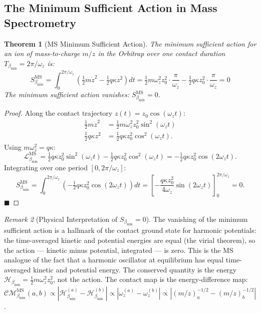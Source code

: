 \documentclass[11pt,twocolumn,a4paper]{article}
\theoremstyle{plain}
\newtheorem{theorem}{Theorem}[section]
\theoremstyle{definition}
\theoremstyle{remark}
\newtheorem{remark}[theorem]{Remark}
\newcommand{\bmin}{\beta_{\min}}
\newcommand{\Lmin}{\mathcal{L}_{\bmin}}
\newcommand{\Smin}{S_{\bmin}}
\newcommand{\Hmin}{\mathcal{H}_{\bmin}}
\newcommand{\CM}{\mathcal{CM}}
\newcommand{\half}{\tfrac{1}{2}}
\renewcommand{\qed}{\hfill$\blacksquare$}
\begin{document}
\subsection{The Minimum Sufficient Action in Mass Spectrometry}

\begin{theorem}[MS Minimum Sufficient Action]
\label{thm:ms_action}
The minimum sufficient action for an ion of mass-to-charge $m/z$ in the
Orbitrap over one contact duration $T_{\bmin} = 2\pi/\omega_z$ is:
\[
  \Smin^{\mathrm{MS}} = \int_0^{2\pi/\omega_z}
  \left(\half m\dot{z}^2 - \half q\kappa z^2\right)dt
  = \half m\omega_z^2 z_0^2 \cdot \frac{\pi}{\omega_z} - \half q\kappa z_0^2
  \cdot \frac{\pi}{\omega_z} = 0
\]
The minimum sufficient action vanishes: $\Smin^{\mathrm{MS}} = 0$.
\end{theorem}

\begin{proof}
Along the contact trajectory $z(t) = z_0\cos(\omega_z t)$:
\begin{align*}
  \half m\dot{z}^2 &= \half m\omega_z^2 z_0^2\sin^2(\omega_z t) \\
  \half q\kappa z^2 &= \half q\kappa z_0^2\cos^2(\omega_z t).
\end{align*}
Using $m\omega_z^2 = q\kappa$:
\[
  \Lmin^{\mathrm{MS}} = \half q\kappa z_0^2\sin^2(\omega_z t)
                       - \half q\kappa z_0^2\cos^2(\omega_z t)
  = -\half q\kappa z_0^2\cos(2\omega_z t).
\]
Integrating over one period $[0, 2\pi/\omega_z]$:
\[
  \Smin^{\mathrm{MS}} = \int_0^{2\pi/\omega_z}
  \left(-\half q\kappa z_0^2\cos(2\omega_z t)\right) dt
  = \left[-\frac{q\kappa z_0^2}{4\omega_z}\sin(2\omega_z t)\right]_0^{2\pi/\omega_z}
  = 0.
\]
\qed
\end{proof}

\begin{remark}[Physical Interpretation of $\Smin = 0$]
The vanishing of the minimum sufficient action is a hallmark of the contact
ground state for harmonic potentials: the time-averaged kinetic and potential
energies are equal (the virial theorem), so the action --- kinetic minus
potential, integrated --- is zero. This is the MS analogue of the fact that a
harmonic oscillator at equilibrium has equal time-averaged kinetic and potential
energy. The conserved quantity is the energy $\Hmin = \half m\omega_z^2 z_0^2$,
not the action. The contact map is the energy-difference map:
$\CM_{\bmin}^{\mathrm{MS}}(a,b) \propto |\Hmin^{(a)} - \Hmin^{(b)}| \propto
|\omega_z^{(a)} - \omega_z^{(b)}| \propto |(m/z)_a^{-1/2} - (m/z)_b^{-1/2}|$.
\end{remark}
\end{document}
